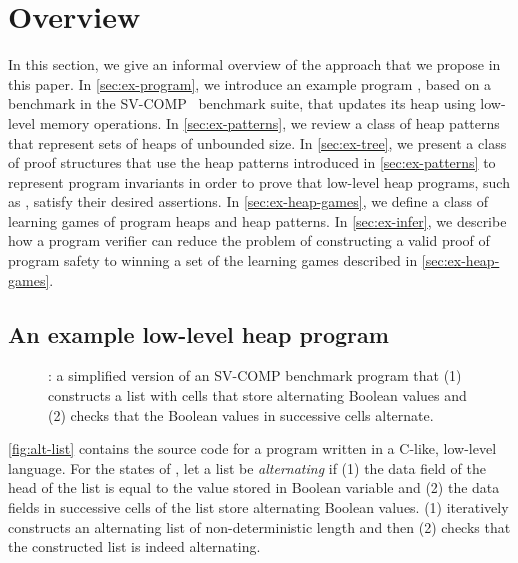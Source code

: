 \section{Overview}
\label{sec:overview}
In this section, we give an informal overview of the approach that we
propose in this paper.
%
In \autoref{sec:ex-program}, we introduce an example program \altlist,
based on a benchmark in the SV-COMP~\cite{sv-comp} benchmark suite,
that updates its heap using low-level memory operations.
%
In \autoref{sec:ex-patterns}, we review a class of heap patterns that
represent sets of heaps of unbounded size.
%
In \autoref{sec:ex-tree}, we present a class of proof structures that
use the heap patterns introduced in \autoref{sec:ex-patterns} to
represent program invariants in order to prove that low-level heap
programs, such as \altlist, satisfy their desired assertions.
%
In \autoref{sec:ex-heap-games}, we define a class of learning games of
program heaps and heap patterns.
%
In \autoref{sec:ex-infer}, we describe how a program verifier can
reduce the problem of constructing a valid proof of program safety to
winning a set of the learning games described in
\autoref{sec:ex-heap-games}.

\subsection{An example low-level heap program}
\label{sec:ex-program}
\begin{figure}
  \centering
  
  \caption{\altlist: a simplified version of an SV-COMP benchmark program that
    (1) constructs a list with cells that store alternating Boolean values
    and
    (2) checks that the Boolean values in successive cells alternate.
  }
  \label{fig:alt-list}
\end{figure}
\autoref{fig:alt-list} contains the source code for a program \altlist
written in a C-like, low-level language.
%
For the states of \altlist, let a list be \emph{alternating} if (1)
the data field of the head of the list is equal to the value stored in
Boolean variable \datavarnm and (2) the data fields in successive
cells of the list store alternating Boolean values.
%
\altlist (1) iteratively constructs an alternating list of
non-deterministic length and then 
%
(2) checks that the constructed list is indeed alternating.

